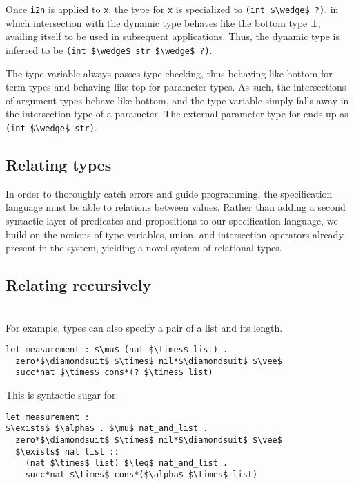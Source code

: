 \documentclass[sigplan,screen]{acmart}
\begin{document}
Once \lstinline{i2n} is applied to \lstinline{x}, 
the type for \lstinline{x} is specialized to \lstinline{(int $\wedge$ ?)}, 
in which intersection with the dynamic type behaves like the bottom type $\bot$,
availing itself to be used in subsequent applications. 
Thus, the dynamic type is inferred to be \lstinline{(int $\wedge$ str $\wedge$ ?)}.

The type variable always passes type checking, 
thus behaving like bottom for term types
and behaving like top for parameter types.
As such, the intersections of argument types behave like bottom,
and the type variable simply falls away in the intersection type of a parameter.
The external parameter type for ends up as \lstinline{(int $\wedge$ str)}. 


\subsection{Relating types}
In order to thoroughly catch errors and guide programming, 
the specification language must be able to relations
between values. Rather than adding a second syntactic layer 
of predicates and propositions to our specification language,
we build on the notions of type variables, union, and 
intersection operators already present in the system, 
yielding a novel system of relational types.


\subsection{Relating recursively}

\hfill \\
For example, types can also specify a pair of a list and its length.

\begin{lstlisting}[]
let measurement : $\mu$ (nat $\times$ list) .
  zero*$\diamondsuit$ $\times$ nil*$\diamondsuit$ $\vee$
  succ*nat $\times$ cons*(? $\times$ list)
\end{lstlisting} 

\hfill

\noindent This is syntactic sugar for:

\begin{lstlisting}[]
let measurement : 
$\exists$ $\alpha$ . $\mu$ nat_and_list .
  zero*$\diamondsuit$ $\times$ nil*$\diamondsuit$ $\vee$ 
  $\exists$ nat list :: 
    (nat $\times$ list) $\leq$ nat_and_list .
    succ*nat $\times$ cons*($\alpha$ $\times$ list)
\end{lstlisting}
\end{document}
